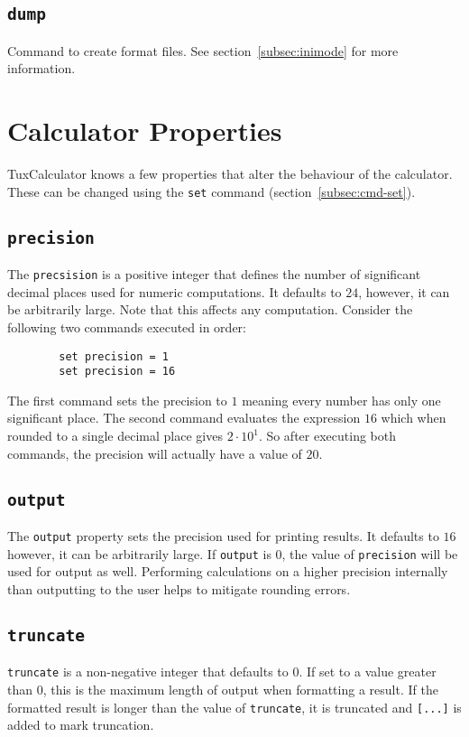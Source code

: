 \documentclass[10pt]{article}
\begin{document}
    \subsection{\texttt{dump}}\label{subsec:cmd-dump}
    Command to create format files.
    See section~\ref{subsec:inimode} for more information.

    \section{Calculator Properties}\label{sec:calculator-properties}
    TuxCalculator knows a few properties that alter the behaviour of the calculator.
    These can be changed using the \verb|set| command (section~\ref{subsec:cmd-set}).
    
    \subsection{\texttt{precision}}\label{subsec:precision}
    The \verb|precsision| is a positive integer that defines the number of significant decimal places used for numeric computations.
    It defaults to $ 24 $, however, it can be arbitrarily large.
    Note that this affects any computation.
    Consider the following two commands executed in order:
    \begin{verbatim}
        set precision = 1
        set precision = 16
    \end{verbatim}
    The first command sets the precision to $ 1 $ meaning every number has only one significant place.
    The second command evaluates the expression $ 16 $ which when rounded to a single decimal place gives $ 2 \cdot 10^1 $.
    So after executing both commands, the precision will actually have a value of $ 20 $.
    
    \subsection{\texttt{output}}\label{subsec:output}
    The \verb|output| property sets the precision used for printing results.
    It defaults to $ 16 $ however, it can be arbitrarily large.
    If \verb|output| is $ 0 $, the value of \verb|precision| will be used for output as well.
    Performing calculations on a higher precision internally than outputting to the user helps to mitigate rounding errors.
    
    \subsection{\texttt{truncate}}\label{subsec:truncate}
    \verb|truncate| is a non-negative integer that defaults to $ 0 $.
    If set to a value greater than $ 0 $, this is the maximum length of output when formatting a result.
    If the formatted result is longer than the value of \verb|truncate|, it is truncated and \verb|[...]| is added to mark truncation.
    
\end{document}
